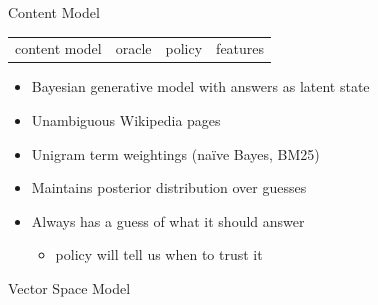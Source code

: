 \documentclass[compress]{beamer}
\newcommand{\gfxq}[2]{
\begin{center}
	\texttt{[image: qb/\#1]}
\end{center}
}
\begin{document}
\begin{frame}{Content Model}

\begin{block}{}
  \begin{center}
    \vspace{-.5cm}
    \begin{tabular}{cccc}
      \alert{content model} & oracle & policy & features \\
    \end{tabular}
    \vspace{-.5cm}
  \end{center}
\end{block}


  \begin{itemize}
   \item Bayesian generative model with answers as latent state
         \item Unambiguous Wikipedia pages
           \item Unigram term weightings (na\"ive Bayes, BM25)
    \item Maintains posterior distribution over guesses
    \item Always has a guess of what it should answer
      \begin{itemize}
        \item policy will tell us when to trust it
       \end{itemize}

  \end{itemize}
\end{frame}

\begin{frame}{Vector Space Model}

  \only<1>{\gfxq{unigram_models_0}{.8}}
  \only<2>{\gfxq{unigram_models_1}{.8}}
  \only<3>{\gfxq{unigram_models_2}{.8}}
  \only<4>{\gfxq{unigram_models_3}{.8}}
  \only<5>{\gfxq{unigram_models_4}{.8}}
  \only<6>{\gfxq{unigram_models_5}{.8}}
  \only<7>{\gfxq{unigram_models_6}{.8}}
  \only<8>{\gfxq{unigram_models_7}{.8}}
  \only<9>{\gfxq{unigram_models_8}{.8}}


\end{frame}
\end{document}
